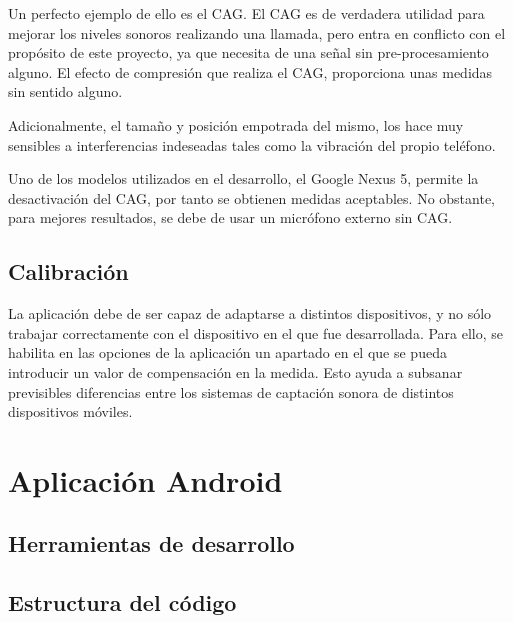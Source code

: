 Un perfecto ejemplo de ello es el \ac{CAG}. El \ac{CAG} es de verdadera utilidad para mejorar los niveles sonoros realizando una llamada, pero entra en conflicto con el propósito de este proyecto, ya que necesita de una señal sin pre-procesamiento alguno. El efecto de compresión que realiza el \ac{CAG}, proporciona unas medidas sin sentido alguno.

Adicionalmente, el tamaño y posición empotrada del mismo, los hace muy sensibles a interferencias indeseadas tales como la vibración del propio teléfono.

Uno de los modelos utilizados en el desarrollo, el Google Nexus 5, permite la desactivación del \ac{CAG}, por tanto se obtienen medidas aceptables. No obstante, para mejores resultados, se debe de usar un micrófono externo sin \ac{CAG}.

\subsection{Calibración}
La aplicación debe de ser capaz de adaptarse a distintos dispositivos, y no sólo trabajar correctamente con el dispositivo en el que fue desarrollada. Para ello, se habilita en las opciones de la aplicación un apartado en el que se pueda introducir un valor de compensación en la medida. Esto ayuda a subsanar previsibles diferencias entre los sistemas de captación sonora de distintos dispositivos móviles.

\section{Aplicación Android}

\subsection{Herramientas de desarrollo}


\subsection{Estructura del código}

